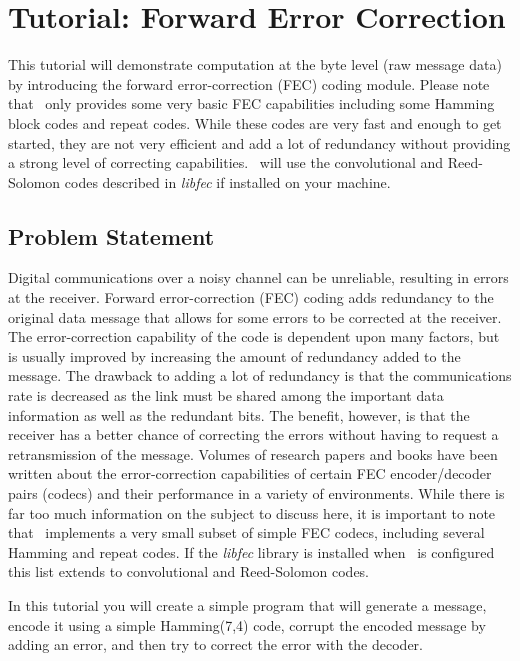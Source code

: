 % 
%

\newpage
\section{Tutorial: Forward Error Correction}
\label{tutorial:fec}

This tutorial will demonstrate computation at the byte level
(raw message data) by
introducing the forward error-correction (FEC) coding module.
Please note that \liquid\ only provides some very basic FEC
capabilities including some Hamming block codes and repeat codes.
While these codes are very fast and enough to get started,
they are not very efficient and add a lot of redundancy without providing
a strong level of correcting capabilities.
\liquid\ will use the convolutional and Reed-Solomon codes described in
{\em libfec} \cite{libfec:web} if installed on your machine.

\subsection{Problem Statement}
\label{tutorial:fec:problem}
Digital communications over a noisy channel can be unreliable,
resulting in errors at the receiver.
Forward error-correction (FEC) coding adds redundancy to the original
data message that allows for some errors to be corrected at the
receiver.
The error-correction capability of the code is dependent upon many
factors, but is usually improved by increasing the amount of redundancy
added to the message.
The drawback to adding a lot of redundancy is that the communications
rate is decreased as the link must be shared among the important data
information as well as the redundant bits.
The benefit, however, is that the receiver has a better chance of
correcting the errors without having to request a retransmission of the
message.
Volumes of research papers and books have been written about the
error-correction capabilities of certain FEC encoder/decoder pairs
(codecs) and their performance in a variety of environments.
While there is far too much information on the subject to discuss here,
it is important to note that \liquid\ implements a very small subset of
simple FEC codecs, including several Hamming and repeat codes.
If the {\em libfec} \cite{libfec:web} library is installed when \liquid\
is configured this list extends to convolutional and Reed-Solomon codes.

In this tutorial you will create a simple program that will generate a
message, encode it using a simple Hamming(7,4) code, corrupt the encoded
message by adding an error, and then try to correct the error with the
decoder.


